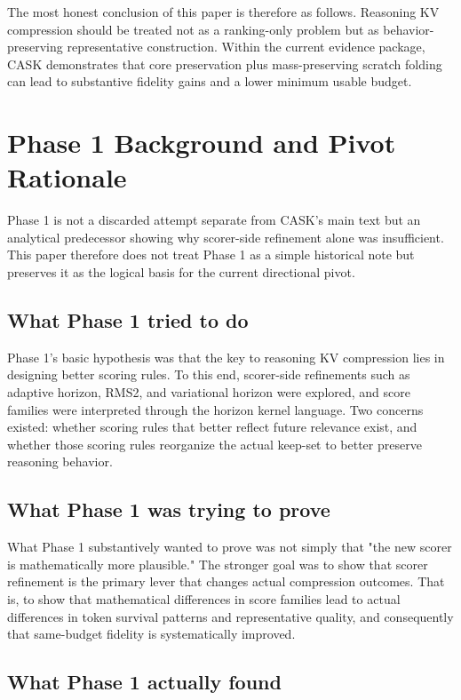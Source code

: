 The most honest conclusion of this paper is therefore as follows. Reasoning KV compression should be treated not as a ranking-only problem but as behavior-preserving representative construction. Within the current evidence package, CASK demonstrates that core preservation plus mass-preserving scratch folding can lead to substantive fidelity gains and a lower minimum usable budget.


\appendix

\section{Phase 1 Background and Pivot Rationale}


Phase 1 is not a discarded attempt separate from CASK's main text but an analytical predecessor showing why scorer-side refinement alone was insufficient. This paper therefore does not treat Phase 1 as a simple historical note but preserves it as the logical basis for the current directional pivot.


\subsection{What Phase 1 tried to do}


Phase 1's basic hypothesis was that the key to reasoning KV compression lies in designing better scoring rules. To this end, scorer-side refinements such as adaptive horizon, RMS2, and variational horizon were explored, and score families were interpreted through the horizon kernel language. Two concerns existed: whether scoring rules that better reflect future relevance exist, and whether those scoring rules reorganize the actual keep-set to better preserve reasoning behavior.


\subsection{What Phase 1 was trying to prove}


What Phase 1 substantively wanted to prove was not simply that "the new scorer is mathematically more plausible." The stronger goal was to show that scorer refinement is the primary lever that changes actual compression outcomes. That is, to show that mathematical differences in score families lead to actual differences in token survival patterns and representative quality, and consequently that same-budget fidelity is systematically improved.


\subsection{What Phase 1 actually found}


